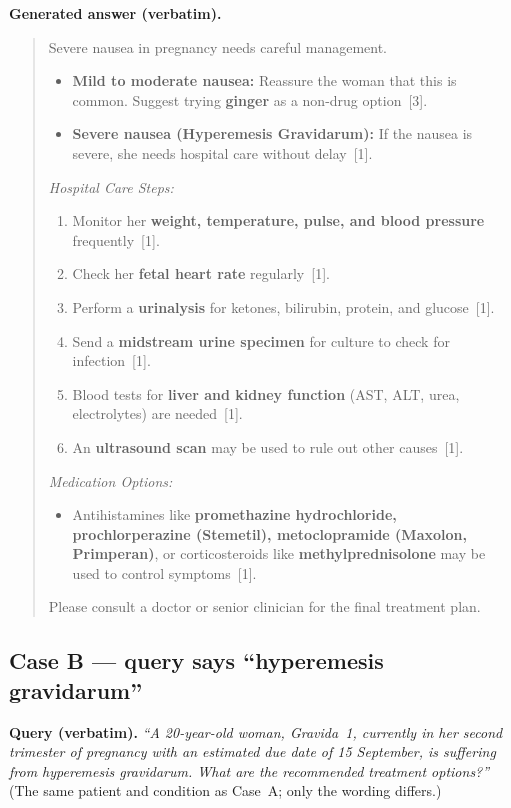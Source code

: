 \smallskip
\noindent\textbf{Generated answer (verbatim).}
\begin{quote}\small
Severe nausea in pregnancy needs careful management.
\begin{itemize}\setlength{\itemsep}{0pt}
  \item \textbf{Mild to moderate nausea:} Reassure the woman that this is
  common. Suggest trying \textbf{ginger} as a non-drug option~[3].
  \item \textbf{Severe nausea (Hyperemesis Gravidarum):} If the nausea is
  severe, she needs hospital care without delay~[1].
\end{itemize}
\emph{Hospital Care Steps:}
\begin{enumerate}\setlength{\itemsep}{0pt}
  \item Monitor her \textbf{weight, temperature, pulse, and blood pressure}
  frequently~[1].
  \item Check her \textbf{fetal heart rate} regularly~[1].
  \item Perform a \textbf{urinalysis} for ketones, bilirubin, protein, and
  glucose~[1].
  \item Send a \textbf{midstream urine specimen} for culture to check for
  infection~[1].
  \item Blood tests for \textbf{liver and kidney function} (AST, ALT, urea,
  electrolytes) are needed~[1].
  \item An \textbf{ultrasound scan} may be used to rule out other causes~[1].
\end{enumerate}
\emph{Medication Options:}
\begin{itemize}\setlength{\itemsep}{0pt}
  \item Antihistamines like \textbf{promethazine hydrochloride,
  prochlorperazine (Stemetil), metoclopramide (Maxolon, Primperan)}, or
  corticosteroids like \textbf{methylprednisolone} may be used to control
  symptoms~[1].
\end{itemize}
Please consult a doctor or senior clinician for the final treatment plan.
\end{quote}

\subsection*{Case B --- query says ``hyperemesis gravidarum''}

\noindent\textbf{Query (verbatim).} \emph{``A 20-year-old woman, Gravida~1,
currently in her second trimester of pregnancy with an estimated due date of
15 September, is suffering from hyperemesis gravidarum. What are the
recommended treatment options?''} (The same patient and condition as Case~A;
only the wording differs.)

